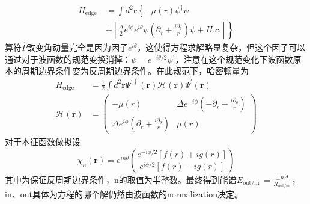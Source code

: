 \documentclass[10pt,openany]{book}
\theoremstyle{thmstyle} %
\theoremstyle{defstyle} %
\theoremstyle{prostyle} %
\begin{document}
\begin{equation}
  \begin{aligned}
    H_{\text {edge }} & =\int d^2 \mathbf{r}\left\{-\mu(r) \psi^{\dagger} \psi\right. \\
    & \left.+\left[\frac{\Delta}{2} e^{i \phi} e^{i \theta} \psi\left(\partial_r+\frac{i \partial_\theta}{r}\right) \psi+H . c .\right]\right\}
    \end{aligned}
\end{equation}
算符$ \hat{P} $改变角动量完全是因为因子$ e^{i\theta} $，这使得方程求解略显复杂，但这个因子可以通过对于波函数的规范变换消掉：$ \psi=e^{-i \theta / 2} \psi^{\prime} $，注意在这个规范变化下波函数原本的周期边界条件变为反周期边界条件。在此规范下，哈密顿量为
\begin{equation}
  \begin{aligned}
    H_{\text {edge }} & =\frac{1}{2} \int d^2 \mathbf{r} \Psi^{\prime \dagger}(\mathbf{r}) \mathcal{H}(\mathbf{r}) \Psi^{\prime}(\mathbf{r}) \\
    \mathcal{H}(\mathbf{r}) & =\left(\begin{array}{cc}
    -\mu(r) & \Delta e^{-i \phi}\left(-\partial_r+\frac{i \partial_\theta}{r}\right) \\
    \Delta e^{i \phi}\left(\partial_r+\frac{i \partial_\theta}{r}\right) & \mu(r)
    \end{array}\right)
    \end{aligned}
\end{equation}
对于本征函数做拟设
\begin{equation*}
  \chi_n(\mathbf{r})=e^{i n \theta}\binom{e^{-i \phi / 2}[f(r)+i g(r)]}{e^{i \phi / 2}[f(r)-i g(r)]}
\end{equation*}
其中为保证反周期边界条件，n的取值为半整数。最终得到能谱$ E_{\text {out/in }}=\frac{\pm n \Delta}{R_{\text {out/in }}} $，in、out具体为方程的哪个解仍然由波函数的normalization决定。\\
\end{document}

